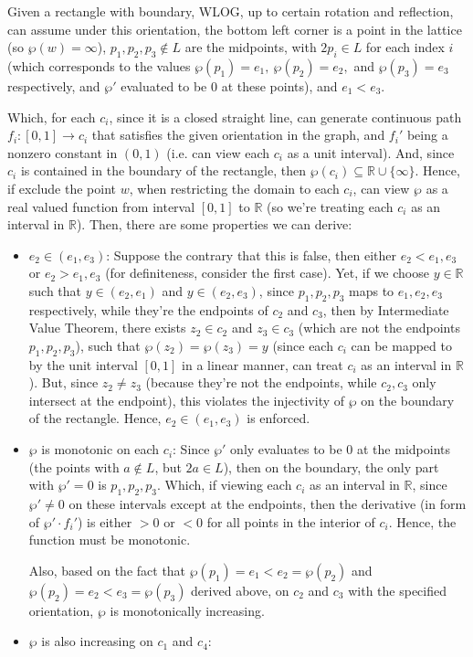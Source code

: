 \documentclass{article}
\begin{document}
\begin{itemize}
    Given a rectangle with boundary, WLOG, up to certain rotation and reflection, can assume under this orientation, the bottom left corner is a point in the lattice (so $\wp(w)=\infty$), $p_1,p_2,p_3\notin L$ are the midpoints, with $2p_i\in L$ for each index $i$ (which corresponds to the values $\wp(p_1)=e_1,\ \wp(p_2)=e_2,$ and $\wp(p_3)=e_3$ respectively, and $\wp'$ evaluated to be $0$ at these points), and $e_1<e_3$.

    Which, for each $c_i$, since it is a closed straight line, can generate continuous path $f_i:[0,1]\rightarrow c_i$ that satisfies the given orientation in the graph, and $f_i'$ being a nonzero constant in $(0,1)$ (i.e. can view each $c_i$ as a unit interval). And, since $c_i$ is contained in the boundary of the rectangle, then $\wp(c_i)\subseteq \mathbb{R}\cup\{\infty\}$. Hence, if exclude the point $w$, when restricting the domain to each $c_i$, can view $\wp$ as a real valued function from interval $[0,1]$ to $\mathbb{R}$ (so we're treating each $c_i$ as an interval in $\mathbb{R}$). Then, there are some properties we can derive:
    \begin{itemize}
        \item $e_2\in (e_1,e_3)$: Suppose the contrary that this is false, then either $e_2<e_1,e_3$ or $e_2>e_1,e_3$ (for definiteness, consider the first case). Yet, if we choose $y\in\mathbb{R}$ such that $y\in (e_2,e_1)$ and $y\in (e_2,e_3)$, since $p_1,p_2,p_3$ maps to $e_1,e_2,e_3$ respectively, while they're the endpoints of $c_2$ and $c_3$, then by Intermediate Value Theorem, there exists $z_2\in c_2$ and $z_3\in c_3$ (which are not the endpoints $p_1,p_2,p_3$), such that $\wp(z_2)=\wp(z_3)=y$ (since each $c_i$ can be mapped to by the unit interval $[0,1]$ in a linear manner, can treat $c_i$ as an interval in $\mathbb{R}$). But, since $z_2\neq z_3$ (because they're not the endpoints, while $c_2,c_3$ only intersect at the endpoint), this violates the injectivity of $\wp$ on the boundary of the rectangle.
        Hence, $e_2\in (e_1,e_3)$ is enforced.

        \item $\wp$ is monotonic on each $c_i$: Since $\wp'$ only evaluates to be $0$ at the midpoints (the points with $a\notin L$, but $2a\in L$), then on the boundary, the only part with $\wp'=0$ is $p_1,p_2,p_3$. Which, if viewing each $c_i$ as an interval in $\mathbb{R}$, since $\wp'\neq 0$ on these intervals except at the endpoints, then the derivative (in form of $\wp' \cdot f_i'$) is either $>0$ or $<0$ for all points in the interior of $c_i$. Hence, the function must be monotonic.
        
        Also, based on the fact that $\wp(p_1)=e_1<e_2=\wp(p_2)$ and $\wp(p_2)=e_2<e_3=\wp(p_3)$ derived above, on $c_2$ and $c_3$ with the specified orientation, $\wp$ is monotonically increasing.

        \item $\wp$ is also increasing on $c_1$ and $c_4$:
    \end{itemize}
\end{itemize}
\end{document}
